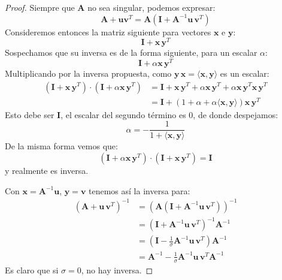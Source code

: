   \begin{proof}
    Siempre que \(\mathbf{A}\) no sea singular,
    podemos expresar:
    \begin{equation*}
      \mathbf{A} + \mathbf{u} \mathbf{v}^T
        = \mathbf{A} (\mathbf{I} + \mathbf{A}^{-1} \mathbf{u} \, \mathbf{v}^T)
    \end{equation*}
    Consideremos entonces la matriz siguiente
    para vectores \(\mathbf{x}\) e \(\mathbf{y}\):
    \begin{equation*}
      \mathbf{I} + \mathbf{x} \, \mathbf{y}^T
    \end{equation*}
    Sospechamos que su inversa es de la forma siguiente,
    para un escalar \(\alpha\):
    \begin{equation*}
      \mathbf{I} + \alpha \mathbf{x} \, \mathbf{y}^T
    \end{equation*}
    Multiplicando por la inversa propuesta,
    como \(\mathbf{y} \, \mathbf{x} = \langle \mathbf{x}, \mathbf{y} \rangle\)
    es un escalar:
    \begin{align*}
      (\mathbf{I} + \mathbf{x} \, \mathbf{y}^T)
        \cdot (\mathbf{I} + \alpha \mathbf{x} \, \mathbf{y}^T)
        &= \mathbf{I}
             + \mathbf{x} \, \mathbf{y}^T
             + \alpha \mathbf{x} \, \mathbf{y}^T
             + \alpha \mathbf{x} \, \mathbf{y}^T \mathbf{x} \, \mathbf{y}^T \\
         &= \mathbf{I}
              + (1 + \alpha + \alpha \langle \mathbf{x}, \mathbf{y} \rangle)
                  \mathbf{x} \, \mathbf{y}^T
    \end{align*}
    Esto debe ser \(\mathbf{I}\),
    el escalar del segundo término es \num{0},
    de donde despejamos:
    \begin{equation*}
      \alpha
        = - \frac{1}{1 + \langle \mathbf{x}, \mathbf{y} \rangle}
    \end{equation*}
    De la misma forma vemos que:
    \begin{equation*}
       (\mathbf{I} + \alpha \mathbf{x} \, \mathbf{y}^T)
          \cdot (\mathbf{I} + \mathbf{x} \, \mathbf{y}^T)
          = \mathbf{I}
    \end{equation*}
    y realmente es inversa.

    Con \(\mathbf{x} = \mathbf{A}^{-1} \mathbf{u}\),
    \(\mathbf{y} = \mathbf{v}\)
    tenemos así la inversa para:
    \begin{align*}
      (\mathbf{A} + \mathbf{u} \, \mathbf{v}^T)^{-1}
        &= (\mathbf{A}
              (\mathbf{I}
                 + \mathbf{A}^{-1} \mathbf{u} \, \mathbf{v}^T))^{-1} \\
        &= (\mathbf{I} + \mathbf{A}^{-1} \mathbf{u} \, \mathbf{v}^T)^{-1}
              \mathbf{A}^{-1} \\
        &= (\mathbf{I}
              - \frac{1}{\sigma} \mathbf{A}^{-1} \mathbf{u} \, \mathbf{v}^T)
              \mathbf{A}^{-1} \\
        &= \mathbf{A}^{-1}
             - \frac{1}{\sigma}
                  \mathbf{A}^{-1} \mathbf{u} \, \mathbf{v}^T \mathbf{A}^{-1}
    \end{align*}
    Es claro que si \(\sigma = 0\),
    no hay inversa.
  \end{proof}
